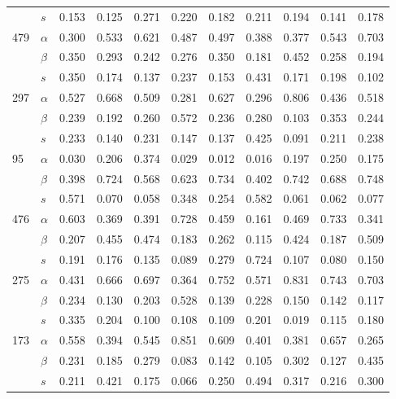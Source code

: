 \begin{longtable}{llrrrrrrrrr}
     & $s$ & 0.153 & 0.125 & 0.271 & 0.220 & 0.182 & 0.211 & 0.194 & 0.141 & 0.178 \\
\cline{1-11}
\multirow{3}{*}{479} & $\alpha$ & 0.300 & 0.533 & 0.621 & 0.487 & 0.497 & 0.388 & 0.377 & 0.543 & 0.703 \\
     & $\beta$ & 0.350 & 0.293 & 0.242 & 0.276 & 0.350 & 0.181 & 0.452 & 0.258 & 0.194 \\
     & $s$ & 0.350 & 0.174 & 0.137 & 0.237 & 0.153 & 0.431 & 0.171 & 0.198 & 0.102 \\
\cline{1-11}
\multirow{3}{*}{297} & $\alpha$ & 0.527 & 0.668 & 0.509 & 0.281 & 0.627 & 0.296 & 0.806 & 0.436 & 0.518 \\
     & $\beta$ & 0.239 & 0.192 & 0.260 & 0.572 & 0.236 & 0.280 & 0.103 & 0.353 & 0.244 \\
     & $s$ & 0.233 & 0.140 & 0.231 & 0.147 & 0.137 & 0.425 & 0.091 & 0.211 & 0.238 \\
\cline{1-11}
\multirow{3}{*}{95} & $\alpha$ & 0.030 & 0.206 & 0.374 & 0.029 & 0.012 & 0.016 & 0.197 & 0.250 & 0.175 \\
     & $\beta$ & 0.398 & 0.724 & 0.568 & 0.623 & 0.734 & 0.402 & 0.742 & 0.688 & 0.748 \\
     & $s$ & 0.571 & 0.070 & 0.058 & 0.348 & 0.254 & 0.582 & 0.061 & 0.062 & 0.077 \\
\cline{1-11}
\multirow{3}{*}{476} & $\alpha$ & 0.603 & 0.369 & 0.391 & 0.728 & 0.459 & 0.161 & 0.469 & 0.733 & 0.341 \\
     & $\beta$ & 0.207 & 0.455 & 0.474 & 0.183 & 0.262 & 0.115 & 0.424 & 0.187 & 0.509 \\
     & $s$ & 0.191 & 0.176 & 0.135 & 0.089 & 0.279 & 0.724 & 0.107 & 0.080 & 0.150 \\
\cline{1-11}
\multirow{3}{*}{275} & $\alpha$ & 0.431 & 0.666 & 0.697 & 0.364 & 0.752 & 0.571 & 0.831 & 0.743 & 0.703 \\
     & $\beta$ & 0.234 & 0.130 & 0.203 & 0.528 & 0.139 & 0.228 & 0.150 & 0.142 & 0.117 \\
     & $s$ & 0.335 & 0.204 & 0.100 & 0.108 & 0.109 & 0.201 & 0.019 & 0.115 & 0.180 \\
\cline{1-11}
\multirow{3}{*}{173} & $\alpha$ & 0.558 & 0.394 & 0.545 & 0.851 & 0.609 & 0.401 & 0.381 & 0.657 & 0.265 \\
     & $\beta$ & 0.231 & 0.185 & 0.279 & 0.083 & 0.142 & 0.105 & 0.302 & 0.127 & 0.435 \\
     & $s$ & 0.211 & 0.421 & 0.175 & 0.066 & 0.250 & 0.494 & 0.317 & 0.216 & 0.300 \\

\end{longtable}
